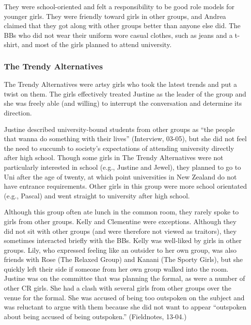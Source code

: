 \vspace{5 mm}

They were school-oriented and felt a responsibility to be good role models for younger girls.  They were friendly toward girls in other groups, and Andrea claimed that they got along with other groups better than anyone else did.  The BBs who did not wear their uniform wore casual clothes, such as jeans and a t-shirt, and most of the girls planned to attend university.  


\subsubsection{The Trendy Alternatives}
The Trendy Alternatives were artsy girls who took the latest trends and put a twist on them.  The girls effectively treated Justine as the leader of the group and she was freely able (and willing) to interrupt the conversation and determine its direction.

Justine described university-bound students from other groups as ``the people that wanna do something with their lives'' (Interview, 03-05), but she did not feel the need to succumb to society's expectations of attending university directly after high school.  Though some girls in The Trendy Alternatives were not particularly interested in school (e.g., Justine and Jewel), they planned to go to Uni after the age of twenty, at which point universities in New Zealand do not have entrance requirements.  Other girls in this group were more school orientated (e.g., Pascal) and went straight to university after high school. 

Although this group often ate lunch in the common room, they rarely spoke to girls from other groups.  Kelly and Clementine were exceptions.  Although they did not sit with other groups (and were therefore not viewed as traitors), they sometimes interacted briefly with the BBs.  Kelly was well-liked by girls in other groups.  Lily, who expressed feeling like an outsider to her own group, was also friends with Rose (The Relaxed Group) and Kanani (The Sporty Girls), but she quickly left their side if someone from her own group walked into the room.  Justine was on the committee that was planning the formal, as were a number of other CR girls.  She had a clash with several girls from other groups over the venue for the formal.  She was accused of being too outspoken on the subject and was reluctant to argue with them because she did not want to appear ``outspoken about being accused of being outspoken.'' (Fieldnotes, 13-04.)

